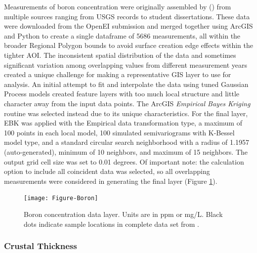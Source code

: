 Measurements of boron concentration were originally assembled by \citeauthor{bielicki_hydrogeolgic_2015} (\citeyear{bielicki_hydrogeolgic_2015}) from multiple sources ranging from USGS records to student dissertations. These data were downloaded from the OpenEI submission \citep{kelley_geothermal_2015} and merged together using ArcGIS and Python to create a single dataframe of 5686 measurements, all within the broader Regional Polygon bounds to avoid surface creation edge effects within the tighter AOI. The inconsistent spatial distribution of the data and sometimes significant variation among overlapping values from different measurement years created a unique challenge for making a representative GIS layer to use for analysis. An initial attempt to fit and interpolate the data using tuned Gaussian Process models created feature layers with too much local structure and little character away from the input data points. The ArcGIS \textit{Empirical Bayes Kriging} routine was selected instead due to its unique characteristics. For the final layer, EBK was applied with the Empirical data transformation type, a maximum of 100 points in each local model, 100 simulated semivariograms with K-Bessel model type, and a standard circular search neighborhood with a radius of 1.1957 (auto-generated), minimum of 10 neighbors, and maximum of 15 neighbors. The output grid cell size was set to 0.01 degrees. Of important note: the calculation option to include all coincident data was selected, so all overlapping measurements were considered in generating the final layer (Figure \ref{fig:feat_boron}).

\begin{figure}[!htp]
\centering
\texttt{[image: Figure-Boron]}
\caption[Boron concentration data layer]{Boron concentration data layer. Units are in ppm or mg/L. Black dots indicate sample locations in complete data set from \protect\citep{bielicki_hydrogeolgic_2015}.}
\label{fig:feat_boron}
\end{figure}

\subsubsection{Crustal Thickness}

